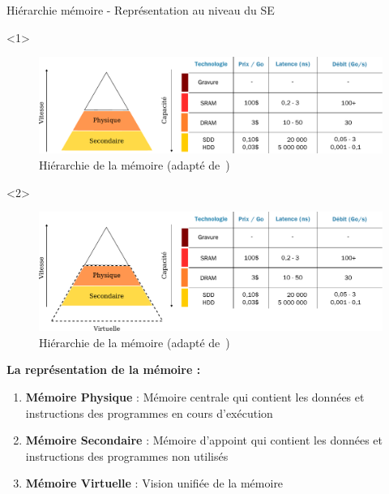 \documentclass[8pt]{beamer}
\begin{document}
\begin{frame}{Hiérarchie mémoire - Représentation au niveau du SE}
    \begin{onlyenv}<1>
        \begin{figure}
            \centering

            \includegraphics[width=\linewidth]{figures/hierarchy_memory_virtual.pdf}
            \caption{Hiérarchie de la mémoire (adapté
                de~\cite{harris2021digital})}
        \end{figure}
    \end{onlyenv}
    \begin{onlyenv}<2>
        \begin{figure}
            \centering

            \includegraphics[width=\linewidth]{figures/hierarchy_memory_virtual_physic.pdf}
            \caption{Hiérarchie de la mémoire (adapté
                de~\cite{harris2021digital})}
        \end{figure}
    \end{onlyenv}

    \textbf{La représentation de la mémoire :}
    \begin{enumerate}
        \item \textbf{Mémoire Physique} : Mémoire centrale qui contient
              les
              données et instructions des programmes en cours d'exécution
        \item \textbf{Mémoire Secondaire} : Mémoire d'appoint qui
              contient
              les données et instructions des programmes non utilisés
        \item<2> \textbf{Mémoire Virtuelle} : Vision unifiée de la
            mémoire

    \end{enumerate}
\end{frame}
\end{document}

